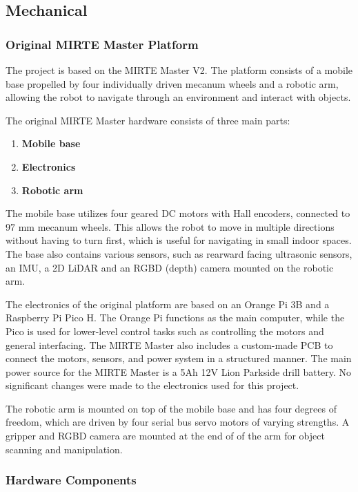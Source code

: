 \subsection{Mechanical}

\subsubsection{Original MIRTE Master Platform}

The project is based on the MIRTE Master V2. The platform consists of a mobile base propelled by four individually driven mecanum wheels and a robotic arm, allowing the robot to navigate through an environment and interact with objects.

The original MIRTE Master hardware consists of three main parts:

\begin{enumerate}
\item \textbf{Mobile base}
\item \textbf{Electronics}
\item \textbf{Robotic arm}
\end{enumerate}

The mobile base utilizes four geared DC motors with Hall encoders, connected to 97 mm mecanum wheels. This allows the robot to move in multiple directions without having to turn first, which is useful for navigating in small indoor spaces. The base also contains various sensors, such as rearward facing ultrasonic sensors, an IMU, a 2D LiDAR and an RGBD (depth) camera mounted on the robotic arm.

The electronics of the original platform are based on an Orange Pi 3B and a Raspberry Pi Pico H. The Orange Pi functions as the main computer, while the Pico is used for lower-level control tasks such as controlling the motors and general interfacing. The MIRTE Master also includes a custom-made PCB to connect the motors, sensors, and power system in a structured manner. The main power source for the MIRTE Master is a 5Ah 12V Lion Parkside drill battery. No significant changes were made to the electronics used for this project.

The robotic arm is mounted on top of the mobile base and has four degrees of freedom, which are driven by four serial bus servo motors of varying strengths. A gripper and RGBD camera are mounted at the end of of the arm for object scanning and manipulation.

\subsubsection{Hardware Components}

